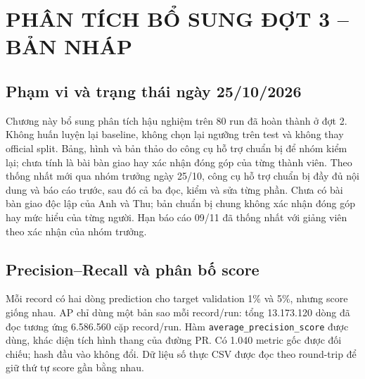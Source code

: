 
\chapter{PHÂN TÍCH BỔ SUNG ĐỢT 3 -- BẢN NHÁP}
\label{chap:dot3}
\section{Phạm vi và trạng thái ngày 25/10/2026}
Chương này bổ sung phân tích hậu nghiệm trên 80 run đã hoàn thành ở đợt 2. Không huấn luyện lại baseline, không chọn lại ngưỡng trên test và không thay official split. Bảng, hình và bản thảo do công cụ hỗ trợ chuẩn bị để nhóm kiểm lại; chưa tính là bài bàn giao hay xác nhận đóng góp của từng thành viên. Theo thống nhất mới qua nhóm trưởng ngày 25/10, công cụ hỗ trợ chuẩn bị đầy đủ nội dung và báo cáo trước, sau đó cả ba đọc, kiểm và sửa từng phần. Chưa có bài bàn giao độc lập của Anh và Thu; bản chuẩn bị chung không xác nhận đóng góp hay mức hiểu của từng người. Hạn báo cáo 09/11 đã thống nhất với giảng viên theo xác nhận của nhóm trưởng.

\section{Precision--Recall và phân bố score}
Mỗi record có hai dòng prediction cho target validation 1\% và 5\%, nhưng score giống nhau. AP chỉ dùng một bản sao mỗi record/run: tổng 13.173.120 dòng đã đọc tương ứng 6.586.560 cặp record/run. Hàm \texttt{average\_precision\_score} được dùng, khác diện tích hình thang của đường PR. Có 1.040 metric gốc được đối chiếu; hash đầu vào không đổi. Dữ liệu số thực CSV được đọc theo round-trip để giữ thứ tự score gần bằng nhau.

